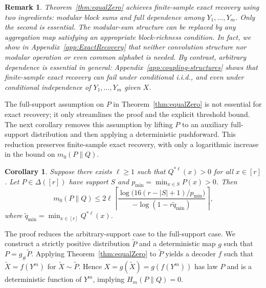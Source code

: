 \documentclass[journal]{IEEEtran}
\newtheorem{corollary}{Corollary}
\newtheorem{remark}{Remark}
\newcommand{\1}{\mathbf{1}}
\begin{document}
\begin{remark}
Theorem~\ref{thm:equalZero} achieves finite-sample exact recovery using two
ingredients: modular block sums and full dependence among $Y_1,\ldots,Y_m$.
Only the second is essential. The modular-sum structure can be replaced by any
aggregation map satisfying an appropriate block-richness condition. In fact, we show 
in Appendix~\ref{app:ExactRecovery} that neither convolution structure nor modular
operation or even common alphabet is needed. By contrast,
arbitrary dependence is essential in general:
Appendix~\ref{app:coupling-structures} shows that finite-sample exact recovery
can fail under conditional i.i.d., and even under conditional
independence of $Y_1,\ldots,Y_m$ given $X$.
\end{remark}
The full-support assumption on $P$ in Theorem~\ref{thm:equalZero} is not
essential for exact recovery; it only streamlines the proof and the explicit
threshold bound. The next corollary removes this assumption by lifting $P$ to
an auxiliary full-support distribution and then applying a deterministic
pushforward. This reduction preserves finite-sample exact recovery, with only
a logarithmic increase in the bound on $m_0(P\|Q)$.

\begin{corollary}\label{cor:equalZero-arbitrary-support}
Suppose there exists $\ell\ge1$ such that $Q^{*\ell}(x)>0$ for all $x\in[r]$. Let $P\in\Delta([r])$ have support $S$ and $p_{\min}=\min_{x\in S}P(x)>0$. Then
$$m_0(P\|Q) \le 2\ell \left\lceil \frac{\log\!\bigl(16(r-|S|+1)/p_{\min}\bigr)}{-\log(1-r\widetilde q_{\min})} \right\rceil,$$
where $\widetilde q_{\min}=\min_{x\in[r]} Q^{*\ell}(x)$.
\end{corollary}

The proof reduces the arbitrary-support case to the full-support case. We
construct a strictly positive distribution $\widetilde P$ and a deterministic
map $g$ such that $P=g_{\#}\widetilde P$. Applying
Theorem~\ref{thm:equalZero} to $\widetilde P$ yields a decoder $f$ such that
$\widetilde X=f(Y^m)$ for $\widetilde X\sim\widetilde P$. Hence
$X=g(\widetilde X)=g(f(Y^m))$ has law $P$ and is a deterministic function of
$Y^m$, implying $H_m(P\|Q)=0$.
\end{document}
